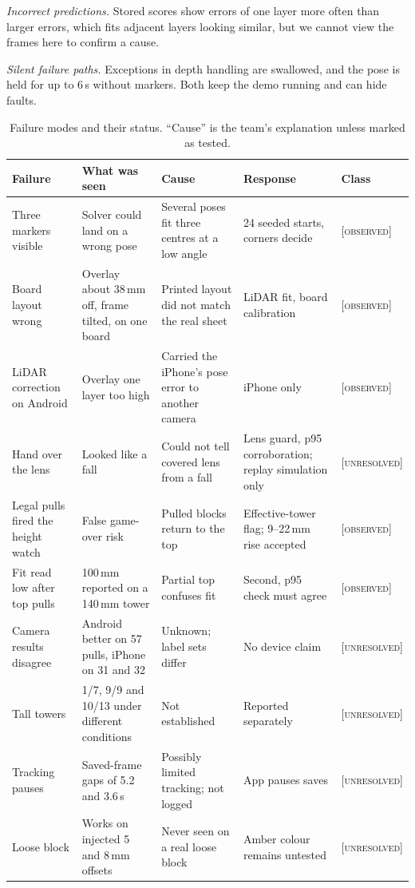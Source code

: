 \documentclass[conference,10pt]{IEEEtran}
\newcommand{\evO}{\textsc{[observed]}}
\newcommand{\evU}{\textsc{[unresolved]}}
\begin{document}
\emph{Incorrect predictions.} Stored scores show errors of one layer more often than larger errors, which fits adjacent layers looking similar, but we cannot view the frames here to confirm a cause.

\emph{Silent failure paths.} Exceptions in depth handling are swallowed, and the pose is held for up to 6\,s without markers. Both keep the demo running and can hide faults.

\begin{table}[!t]
\caption{Failure modes and their status. ``Cause'' is the team's explanation unless marked as tested.}\label{tab:failures}
\centering\footnotesize
\begin{tabular}{@{}p{3.0cm}p{4.1cm}p{4.2cm}p{3.1cm}p{1.8cm}@{}}
\toprule
Failure & What was seen & Cause & Response & Class \\
\midrule
Three markers visible & Solver could land on a wrong pose & Several poses fit three centres at a low angle & 24 seeded starts, corners decide & \evO \\
Board layout wrong & Overlay about 38\,mm off, frame tilted, on one board & Printed layout did not match the real sheet & LiDAR fit, board calibration & \evO \\
LiDAR correction on Android & Overlay one layer too high & Carried the iPhone's pose error to another camera & iPhone only & \evO \\
Hand over the lens & Looked like a fall & Could not tell covered lens from a fall & Lens guard, p95 corroboration; replay simulation only & \evU \\
Legal pulls fired the height watch & False game-over risk & Pulled blocks return to the top & Effective-tower flag; 9--22\,mm rise accepted & \evO \\
Fit read low after top pulls & 100\,mm reported on a 140\,mm tower & Partial top confuses fit & Second, p95 check must agree & \evO \\
Camera results disagree & Android better on 57 pulls, iPhone on 31 and 32 & Unknown; label sets differ & No device claim & \evU \\
Tall towers & 1/7, 9/9 and 10/13 under different conditions & Not established & Reported separately & \evU \\
Tracking pauses & Saved-frame gaps of 5.2 and 3.6\,s & Possibly limited tracking; not logged & App pauses saves & \evU \\
Loose block & Works on injected 5 and 8\,mm offsets & Never seen on a real loose block & Amber colour remains untested & \evU \\
\bottomrule
\end{tabular}
\end{table}
\end{document}
